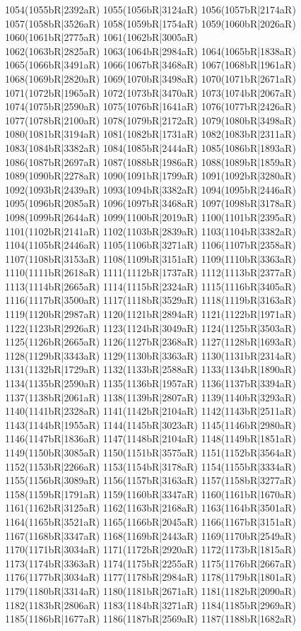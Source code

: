 1054(1055bR|2392aR) 1055(1056bR|3124aR) 1056(1057bR|2174aR) 1057(1058bR|3526aR) 1058(1059bR|1754aR) 1059(1060bR|2026aR) 1060(1061bR|2775aR) 1061(1062bR|3005aR) \\1062(1063bR|2825aR) 1063(1064bR|2984aR) 1064(1065bR|1838aR) 1065(1066bR|3491aR) 1066(1067bR|3468aR) 1067(1068bR|1961aR) 1068(1069bR|2820aR) 1069(1070bR|3498aR) 1070(1071bR|2671aR) \\1071(1072bR|1965aR) 1072(1073bR|3470aR) 1073(1074bR|2067aR) 1074(1075bR|2590aR) 1075(1076bR|1641aR) 1076(1077bR|2426aR) 1077(1078bR|2100aR) 1078(1079bR|2172aR) 1079(1080bR|3498aR) \\1080(1081bR|3194aR) 1081(1082bR|1731aR) 1082(1083bR|2311aR) 1083(1084bR|3382aR) 1084(1085bR|2444aR) 1085(1086bR|1893aR) 1086(1087bR|2697aR) 1087(1088bR|1986aR) 1088(1089bR|1859aR) \\1089(1090bR|2278aR) 1090(1091bR|1799aR) 1091(1092bR|3280aR) 1092(1093bR|2439aR) 1093(1094bR|3382aR) 1094(1095bR|2446aR) 1095(1096bR|2085aR) 1096(1097bR|3468aR) 1097(1098bR|3178aR) \\1098(1099bR|2644aR) 1099(1100bR|2019aR) 1100(1101bR|2395aR) 1101(1102bR|2141aR) 1102(1103bR|2839aR) 1103(1104bR|3382aR) 1104(1105bR|2446aR) 1105(1106bR|3271aR) 1106(1107bR|2358aR) \\1107(1108bR|3153aR) 1108(1109bR|3151aR) 1109(1110bR|3363aR) 1110(1111bR|2618aR) 1111(1112bR|1737aR) 1112(1113bR|2377aR) 1113(1114bR|2665aR) 1114(1115bR|2324aR) 1115(1116bR|3405aR) \\1116(1117bR|3500aR) 1117(1118bR|3529aR) 1118(1119bR|3163aR) 1119(1120bR|2987aR) 1120(1121bR|2894aR) 1121(1122bR|1971aR) 1122(1123bR|2926aR) 1123(1124bR|3049aR) 1124(1125bR|3503aR) \\1125(1126bR|2665aR) 1126(1127bR|2368aR) 1127(1128bR|1693aR) 1128(1129bR|3343aR) 1129(1130bR|3363aR) 1130(1131bR|2314aR) 1131(1132bR|1729aR) 1132(1133bR|2588aR) 1133(1134bR|1890aR) \\1134(1135bR|2590aR) 1135(1136bR|1957aR) 1136(1137bR|3394aR) 1137(1138bR|2061aR) 1138(1139bR|2807aR) 1139(1140bR|3293aR) 1140(1141bR|2328aR) 1141(1142bR|2104aR) 1142(1143bR|2511aR) \\1143(1144bR|1955aR) 1144(1145bR|3023aR) 1145(1146bR|2980aR) 1146(1147bR|1836aR) 1147(1148bR|2104aR) 1148(1149bR|1851aR) 1149(1150bR|3085aR) 1150(1151bR|3575aR) 1151(1152bR|3564aR) \\1152(1153bR|2266aR) 1153(1154bR|3178aR) 1154(1155bR|3334aR) 1155(1156bR|3089aR) 1156(1157bR|3163aR) 1157(1158bR|3277aR) 1158(1159bR|1791aR) 1159(1160bR|3347aR) 1160(1161bR|1670aR) \\1161(1162bR|3125aR) 1162(1163bR|2168aR) 1163(1164bR|3501aR) 1164(1165bR|3521aR) 1165(1166bR|2045aR) 1166(1167bR|3151aR) 1167(1168bR|3347aR) 1168(1169bR|2443aR) 1169(1170bR|2549aR) \\1170(1171bR|3034aR) 1171(1172bR|2920aR) 1172(1173bR|1815aR) 1173(1174bR|3363aR) 1174(1175bR|2255aR) 1175(1176bR|2667aR) 1176(1177bR|3034aR) 1177(1178bR|2984aR) 1178(1179bR|1801aR) \\1179(1180bR|3314aR) 1180(1181bR|2671aR) 1181(1182bR|2090aR) 1182(1183bR|2806aR) 1183(1184bR|3271aR) 1184(1185bR|2969aR) 1185(1186bR|1677aR) 1186(1187bR|2569aR) 1187(1188bR|1682aR) 